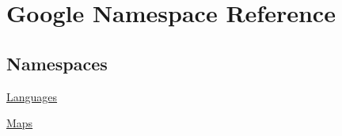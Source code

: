\hypertarget{a00032}{}\section{Google Namespace Reference}
\label{a00032}
\subsection*{Namespaces}
\begin{DoxyCompactItemize}
\item 
 \hyperlink{a00036}{Languages}
\item 
 \hyperlink{a00033}{Maps}
\end{DoxyCompactItemize}
